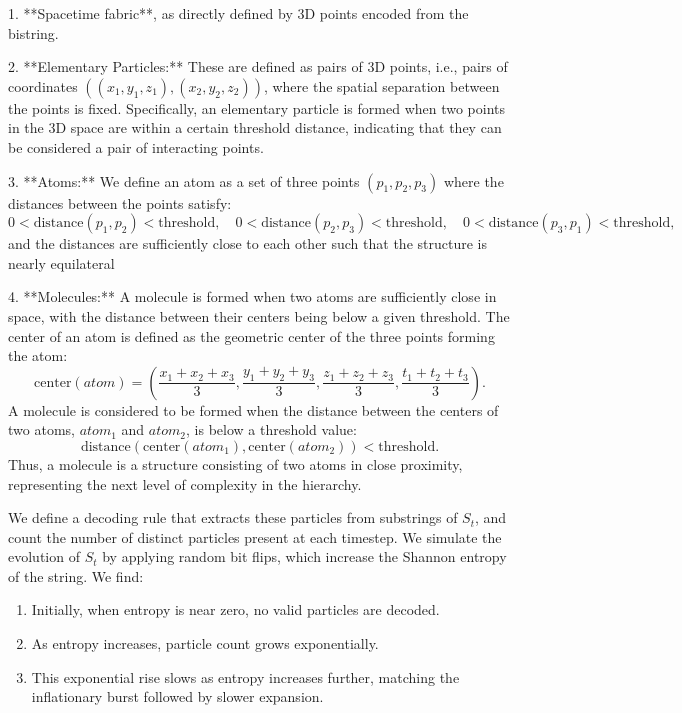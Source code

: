 \documentclass[11pt]{article}
\begin{document}
1. **Spacetime fabric**, as directly defined by 3D points encoded from the bistring.

2. **Elementary Particles:** These are defined as pairs of 3D points, i.e., pairs of
coordinates $((x_1, y_1, z_1), (x_2, y_2, z_2))$, where the spatial separation between the
points is fixed. Specifically, an elementary particle is formed when two points in the 3D space are within
a certain threshold distance, indicating that they can be considered a pair of interacting points.

3. **Atoms:** We define an atom as a set of three points $(p_1, p_2, p_3)$ where the distances between the points satisfy:
\[
   0 < \text{distance}(p_1, p_2) < \text{threshold}, \quad 0 < \text{distance}(p_2, p_3) < \text{threshold}, \quad 0 < \text{distance}(p_3, p_1) < \text{threshold},
\]
and the distances are sufficiently close to each other such that the structure is nearly equilateral

4. **Molecules:** A molecule is formed when two atoms are sufficiently close in space, with the distance between
their centers being below a given threshold. The center of an atom is defined as the geometric center of the three points forming the atom:
\[
   \text{center}(atom) = \left( \frac{x_1 + x_2 + x_3}{3}, \frac{y_1 + y_2 + y_3}{3}, \frac{z_1 + z_2 + z_3}{3}, \frac{t_1 + t_2 + t_3}{3} \right).
\]
A molecule is considered to be formed when the distance between the centers of two atoms, $atom_1$ and $atom_2$, is below a threshold value:
\[
   \text{distance}(\text{center}(atom_1), \text{center}(atom_2)) < \text{threshold}.
\]
Thus, a molecule is a structure consisting of two atoms in close proximity, representing the next level of complexity in the hierarchy.


We define a decoding rule that extracts these particles from substrings of $S_t$, and count the number of distinct particles
present at each timestep. We simulate the evolution of $S_t$ by applying random bit flips, which increase the Shannon entropy of the string.
We find:

\begin{enumerate}
   \item Initially, when entropy is near zero, no valid particles are decoded.
   \item As entropy increases, particle count grows exponentially.
   \item This exponential rise slows as entropy increases further, matching the inflationary burst followed by slower expansion.
\end{enumerate}
\end{document}
